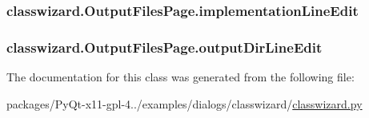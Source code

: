 \subsubsection[{implementation\+Line\+Edit}]{\setlength{\rightskip}{0pt plus 5cm}classwizard.\+Output\+Files\+Page.\+implementation\+Line\+Edit}\label{classclasswizard_1_1OutputFilesPage_a8d2d292c1d2acdcf79292baf1ab63ff0}
\hypertarget{classclasswizard_1_1OutputFilesPage_adaee735ccd60ca7113e40325b259e892}{}
\subsubsection[{output\+Dir\+Line\+Edit}]{\setlength{\rightskip}{0pt plus 5cm}classwizard.\+Output\+Files\+Page.\+output\+Dir\+Line\+Edit}\label{classclasswizard_1_1OutputFilesPage_adaee735ccd60ca7113e40325b259e892}


The documentation for this class was generated from the following file\+:\begin{DoxyCompactItemize}
\item 
packages/\+Py\+Qt-\/x11-\/gpl-\/4../examples/dialogs/classwizard/\hyperlink{classwizard_8py}{classwizard.\+py}\end{DoxyCompactItemize}
